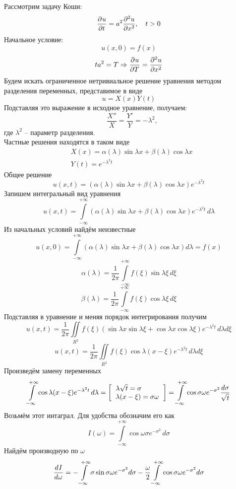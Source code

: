 Рассмотрим задачу Коши:
\[
	\frac{\partial^{}u}{\partial t^{}} = a^2 \frac{\partial^{2}u}{\partial x^{2}}, \quad t > 0\\
\]
Начальное условие:
\[
	u(x, 0) = f(x)
\]
\[
	t a^2 = T \Rightarrow \frac{\partial^{}u}{\partial T^{}} = \frac{\partial^{2}u}{\partial x^{2}}
\]
Будем искать ограниченное нетривиальное решение уравнения методом разделения переменных, представимое в виде
\[
	u = X(x) Y(t) 
\]
Подставляя это выражение в исходное уравнение, получаем:
\[
	\quad \frac{X''}{X} = \frac{Y'}{Y} = - \lambda^2,
\]
где $\lambda^2$ -- параметр разделения.\\
Частные решения находятся в таком виде
\begin{align*}
	&X(x) = \alpha (\lambda) \sin \lambda x + \beta (\lambda) \cos \lambda x\\
	&Y(t) = e^{- \lambda^2 t}
\end{align*}
Общее решение
\[u(x, t) = (\alpha (\lambda) \sin \lambda x + \beta(\lambda) \cos \lambda x) e^{-\lambda^2 t}\] 
Запишем интегральный вид уравнения
\[u(x, t) = \int\limits_{-\infty}^{+ \infty} (\alpha (\lambda) \sin \lambda x + \beta (\lambda) \cos \lambda x) e^{-\lambda^2 t} \,  d \lambda\]
Из начальных условий найдём неизвестные
\[u(x, 0) = \int\limits_{-\infty}^{+ \infty} (\alpha (\lambda) \sin \lambda x + \beta (\lambda) \cos \lambda x) d\lambda = f(x)\]
\[\alpha (\lambda) = \frac{1}{2 \pi} \int\limits_{- \infty}^{+ \infty} f (\xi) \sin \lambda \xi \, d \xi\]
\[\beta(\lambda) = \frac{1}{2 \pi} \int\limits_{- \infty}^{+ \infty} f (\xi) \cos \lambda \xi \, d \xi\]
Подставляя в уравнение и меняя порядок интегрирования получим
\[u(x,t) = \frac{1}{2 \pi} \iint\limits_{R^2} f(\xi) (\sin \lambda x \sin \lambda \xi + \cos \lambda x \cos \lambda \xi) e^{- \lambda^2 t} \, d \lambda d \xi \]
\[u(x, t) = \frac{1}{2 \pi} \iint\limits_{R^2} f(\xi) \cos \lambda (x - \xi) e^{- \lambda^2 t} \, d \lambda  d \xi\]
Произведём замену переменных
\[
	\int\limits_{- \infty}^{ + \infty} \cos \lambda (x - \xi) e^{- \lambda^2 t} \, d \lambda = \left[ 
		\begin{tabular}{l}
			$\lambda \sqrt{t} = \sigma$\\ 
			$\lambda(x - \xi) = \sigma \omega$ 
		\end{tabular} \right] 
	= \int\limits_{- \infty}^{ + \infty} \cos \sigma \omega e^{- \sigma^2} \frac{d \sigma}{\sqrt{t}}
\]
Возьмём этот интаграл. Для удобства обозначим его как
\[I(\omega) = \int\limits_{- \infty}^{ + \infty} \cos \omega \sigma e^{- \sigma^2} \, d \sigma\]
Найдём производную по $\omega$
\[\frac{d^{}I}{d\omega^{}} = - \int\limits_{- \infty}^{ + \infty}\sigma \sin \sigma \omega e^{- \sigma^2} d \sigma - \frac{\omega}{2} \int\limits_{- \infty}^{ + \infty} \cos \sigma \omega e^{-\sigma^2} d \sigma\]
